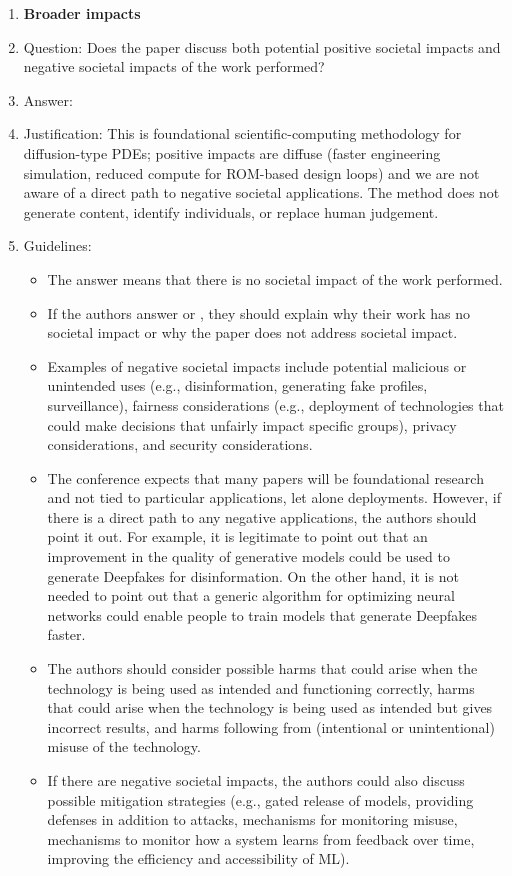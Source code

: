 \begin{enumerate}
\item {\bf Broader impacts}
    \item[] Question: Does the paper discuss both potential positive societal impacts and negative societal impacts of the work performed?
    \item[] Answer: \answerNA{}
    \item[] Justification: This is foundational scientific-computing methodology for diffusion-type PDEs; positive impacts are diffuse (faster engineering simulation, reduced compute for ROM-based design loops) and we are not aware of a direct path to negative societal applications. The method does not generate content, identify individuals, or replace human judgement.
    \item[] Guidelines:
    \begin{itemize}
        \item The answer \answerNA{} means that there is no societal impact of the work performed.
        \item If the authors answer \answerNA{} or \answerNo, they should explain why their work has no societal impact or why the paper does not address societal impact.
        \item Examples of negative societal impacts include potential malicious or unintended uses (e.g., disinformation, generating fake profiles, surveillance), fairness considerations (e.g., deployment of technologies that could make decisions that unfairly impact specific groups), privacy considerations, and security considerations.
        \item The conference expects that many papers will be foundational research and not tied to particular applications, let alone deployments. However, if there is a direct path to any negative applications, the authors should point it out. For example, it is legitimate to point out that an improvement in the quality of generative models could be used to generate Deepfakes for disinformation. On the other hand, it is not needed to point out that a generic algorithm for optimizing neural networks could enable people to train models that generate Deepfakes faster.
        \item The authors should consider possible harms that could arise when the technology is being used as intended and functioning correctly, harms that could arise when the technology is being used as intended but gives incorrect results, and harms following from (intentional or unintentional) misuse of the technology.
        \item If there are negative societal impacts, the authors could also discuss possible mitigation strategies (e.g., gated release of models, providing defenses in addition to attacks, mechanisms for monitoring misuse, mechanisms to monitor how a system learns from feedback over time, improving the efficiency and accessibility of ML).
    \end{itemize}
    

\end{enumerate}
